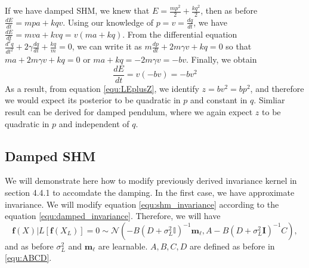 \documentclass{statsmsc}
\begin{document}
If we have damped SHM, we knew that $E=\frac{mp^2}{2}+\frac{kq^2}{2}$, then as before $\frac{dE}{dt}=mpa+kqv$.
Using our knowledge of $p=v=\frac{dq}{dt}$, we have $\frac{dE}{dt}=mva+kvq=v(ma+kq)$.
From the differential equation $\frac{d^2q}{dt^2}+2\gamma \frac{dq}{dt} +\frac{kq}{m}=0$, we can write it as $m\frac{dp}{dt}+2m\gamma v + kq=0$ so that $ma+2m\gamma v+kq=0$ or $ma+kq=-2m\gamma v=-bv$.
Finally, we obtain
$$
\frac{dE}{dt} = v(-bv) = -bv^2
$$
As a result, from equation \ref{equ:LEplusZ}, we identify $z=bv^2=bp^2$, and therefore we would expect its posterior to be quadratic in $p$ and constant in $q$.
Simliar result can be derived for damped pendulum, where we again expect $z$ to be quadratic in $p$ and independent of $q$.

\subsection{Damped SHM}
We will demonstrate here how to modify previously derived invariance kernel in section 4.4.1 to accomdate the damping.
In the first case, we have approximate invariance.
We will modify equation \ref{equ:shm_invariance} according to the equation \ref{equ:damped_invariance}.
Therefore, we will have
$$
\mathbf{f}(X)|L[\mathbf{f}(X_L)]=0\sim\mathcal{N}(-B(D+\sigma^2_L\mathbb{I})^{-1}\mathbf{m}_\ell,A-B(D+\sigma^2_L\mathbf{I})^{-1}C),
$$
and as before $\sigma_L^2$ and $\mathbf{m}_\ell$ are learnable.
$A, B, C, D$ are defined as before in \ref{equ:ABCD}.
\end{document}
